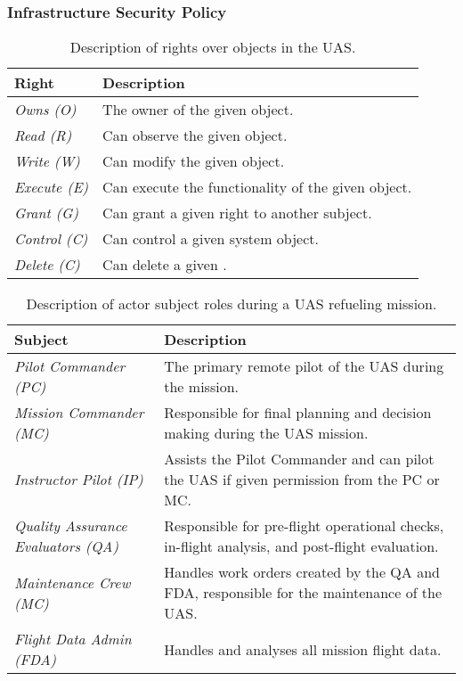\documentclass[10pt,journal,compsoc]{IEEEtran}
\begin{document}
\subsubsection{Infrastructure Security Policy}

\begin{table}[]
  \caption{Description of rights over objects in the UAS.}
  \begin{tabular}{ll}
  \hline
  \textbf{Right}       & \textbf{Description}                               \\ 
  \hline
  \textit{Owns (O)}    & The owner of the given object.                     \\
  \textit{Read (R)}    & Can observe the given object.                      \\
  \textit{Write (W)}   & Can modify the given object.                       \\
  \textit{Execute (E)} & Can execute the functionality of the given object. \\
  \textit{Grant (G)}   & Can grant a given right to another subject.        \\
  \textit{Control (C)} & Can control a given system object.                 \\
  \textit{Delete (C)}  & Can delete a given .                 \\
  \hline
  \end{tabular}
\end{table}

\begin{table*}[]
  \caption{Description of actor subject roles during a UAS refueling mission.}
  \begin{tabular}{ll}
  \hline
  \textbf{Subject}                           & \textbf{Description}                                                                                       \\ 
  \hline
  \textit{Pilot Commander (PC)}              & The primary remote pilot of the UAS during the mission.                                                    \\
  \textit{Mission Commander (MC)}            & Responsible for final planning and decision making during the UAS mission.                                 \\
  \textit{Instructor Pilot (IP)}             & Assists the Pilot Commander and can pilot the UAS if given permission from the PC or MC.                   \\
  \textit{Quality Assurance Evaluators (QA)} & Responsible for pre-flight operational checks, in-flight analysis, and post-flight evaluation.             \\
  \textit{Maintenance Crew (MC)}             & Handles work orders created by the QA and FDA, responsible for the maintenance of the UAS.                 \\
  \textit{Flight Data Admin (FDA)}           & Handles and analyses all mission flight data.                                                              \\
  \hline
  \end{tabular}
\end{table*}
\end{document}
